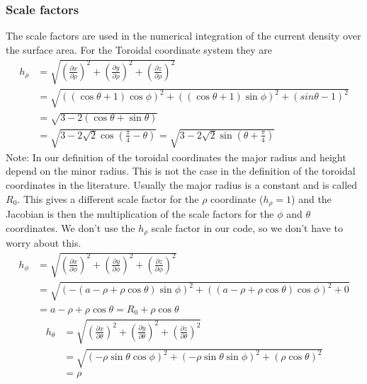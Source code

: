 \documentclass[a4paper,10pt]{article}
\numberwithin{equation}{section}
\begin{document}
\subsubsection{Scale factors}
The scale factors are used in the numerical integration of the current density over the surface area.
For the Toroidal coordinate system they are
\begin{align}
  h_\rho &= \sqrt{\left(\frac{\partial x}{\partial \rho}\right)^2 + \left(\frac{\partial y}{\partial \rho}\right)^2 + \left(\frac{\partial z}{\partial \rho}\right)^2} \\
         &= \sqrt{\left( (\cos\theta+1)\cos\phi \right)^2 + \left( (\cos\theta+1)\sin\phi \right)^2 + \left( sin\theta - 1 \right)^2}\\
         &= \sqrt{3-2\left( \cos\theta + \sin\theta \right)}\\
         &= \sqrt{3-2\sqrt{2}\cos{\left( \frac{\pi}{4} - \theta \right)}} = \sqrt{3-2\sqrt{2}\sin{\left( \theta + \frac{\pi}{4} \right)}}
\end{align}
Note: In our definition of the toroidal coordinates the major radius and height depend on the minor radius. This is not the case in the definition of the toroidal coordinates in the literature.
Usually the major radius is a constant and is called \(R_0\). This gives a different scale factor for the \(\rho\) coordinate (\(h_\rho = 1\)) and the
Jacobian is then the multiplication of the scale factors for the \(\phi\) and \(\theta\) coordinates. We don't use the \(h_\rho\) scale factor in our code, so we don't have to
worry about this.
\begin{align}
  h_\phi &= \sqrt{\left(\frac{\partial x}{\partial \phi}\right)^2 + \left(\frac{\partial y}{\partial \phi}\right)^2 + \left(\frac{\partial z}{\partial \phi}\right)^2} \\
         &= \sqrt{\left( -(a - \rho + \rho\cos\theta)\sin\phi \right)^2 + \left( (a - \rho + \rho\cos\theta)\cos\phi \right)^2 + 0}\\
         &= a - \rho + \rho\cos\theta = R_0 + \rho\cos\theta
\end{align}
\begin{align}
  h_\theta &= \sqrt{\left(\frac{\partial x}{\partial \theta}\right)^2 + \left(\frac{\partial y}{\partial \theta}\right)^2 + \left(\frac{\partial z}{\partial \theta}\right)^2} \\
           &= \sqrt{\left( -\rho\sin\theta\cos\phi \right)^2 + \left( -\rho\sin\theta\sin\phi \right)^2 + \left( \rho\cos\theta \right)^2}\\
           &= \rho
\end{align}
\end{document}
